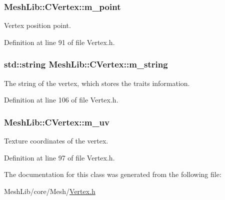 \subsubsection[{\texorpdfstring{m\+\_\+point}{m_point}}]{ Mesh\+Lib\+::\+C\+Vertex\+::m\+\_\+point\hspace{0.3cm}{\ttfamily [protected]}}\hypertarget{class_mesh_lib_1_1_c_vertex_a0611ed63a1451d3077bcb2dbaf5f1e89}{}\label{class_mesh_lib_1_1_c_vertex_a0611ed63a1451d3077bcb2dbaf5f1e89}
Vertex position point. 

Definition at line 91 of file Vertex.\+h.

\subsubsection[{\texorpdfstring{m\+\_\+string}{m_string}}]{\setlength{\rightskip}{0pt plus 5cm}std\+::string Mesh\+Lib\+::\+C\+Vertex\+::m\+\_\+string\hspace{0.3cm}{\ttfamily [protected]}}\hypertarget{class_mesh_lib_1_1_c_vertex_a0ad694c0749eb9b71c0faaafde732d3e}{}\label{class_mesh_lib_1_1_c_vertex_a0ad694c0749eb9b71c0faaafde732d3e}
The string of the vertex, which stores the traits information. 

Definition at line 106 of file Vertex.\+h.

\subsubsection[{\texorpdfstring{m\+\_\+uv}{m_uv}}]{ Mesh\+Lib\+::\+C\+Vertex\+::m\+\_\+uv\hspace{0.3cm}{\ttfamily [protected]}}\hypertarget{class_mesh_lib_1_1_c_vertex_a8509cd466e9db87b76b2571783d111a2}{}\label{class_mesh_lib_1_1_c_vertex_a8509cd466e9db87b76b2571783d111a2}
Texture coordinates of the vertex. 

Definition at line 97 of file Vertex.\+h.



The documentation for this class was generated from the following file\+:\begin{DoxyCompactItemize}
\item 
Mesh\+Lib/core/\+Mesh/\hyperlink{_vertex_8h}{Vertex.\+h}\end{DoxyCompactItemize}

